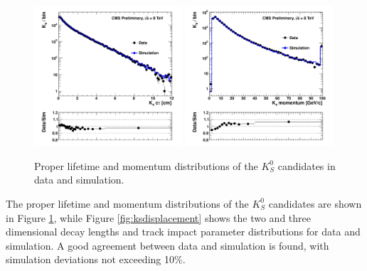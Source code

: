 \begin{figure}[htbp]
\centering
\includegraphics[width=0.49\textwidth]{plots/kshort/ksctau.pdf}
\includegraphics[width=0.49\textwidth]{plots/kshort/ksp.pdf}
\caption{Proper lifetime and momentum distributions of the $K^0_S$ candidates in data and simulation. \label{fig:ksctau}}
\end{figure}

The proper lifetime and momentum distributions of the $K^0_S$ candidates are
shown in Figure \ref{fig:ksctau}, while
Figure \ref{fig:ksdisplacement} shows the two and three dimensional decay lengths and track impact
 parameter distributions for data and simulation.  
 A good agreement between data and simulation is found, with simulation
 deviations not exceeding 10\%.   

